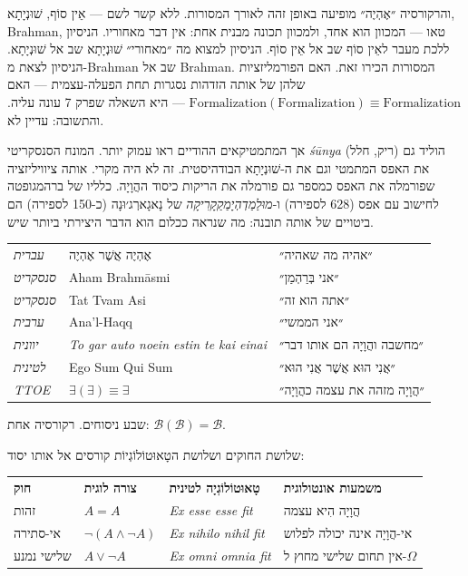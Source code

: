 \documentclass[10pt, openany, oneside]{book}
\renewcommand{\footnotesize}{\fontsize{8.5}{11}\selectfont}
\begin{document}
והרקורסיה ״אֶהְיֶה״ מופיעה באופן זהה לאורך המסורות. ללא קשר לשם — אֵין סוֹף, שׁוּנְיָתָא, Brahman, טאו — המכוון הוא אחד, ולמכוון תכונה מבנית אחת: אין דבר מאחוריו. הניסיון ללכת מעבר לאֵין סוֹף שב אל אֵין סוֹף. הניסיון למצוא מה ״מאחורי״ שׁוּנְיָתָא שב אל שׁוּנְיָתָא. הניסיון לצאת מ-Brahman שב אל Brahman. המסורות הכירו זאת. האם הפורמליזציות שלהן של אותה הזדהות נסגרות תחת הפעלה-עצמית — האם $\text{Formalization}(\text{Formalization}) \equiv \text{Formalization}$ — היא השאלה שפרק 7 עונה עליה. והתשובה: עדיין לא.

אך המתמטיקאים ההודיים ראו עמוק יותר. המונח הסנסקריטי \textit{śūnya} (ריק, חלל) הוליד גם את האפס המתמטי וגם את ה-שׁוּנְיָתָא הבודהיסטית. זה לא היה מקרי. אותה ציוויליזציה שפורמלה את האפס כמספר גם פורמלה את הריקות כיסוד ההֲוָיָה. כלליו של ברהמגופטה לחישוב עם אפס (628 לספירה) ו-\textit{מוּלַמַדְהְיָמַקַקָרִיקָה} של נָאגָארְג׳וּנָה (כ-150 לספירה) הם ביטויים של אותה תובנה: מה שנראה ככלום הוא הדבר היצירתי ביותר שיש.

\vspace{0.3em}

{\footnotesize
\noindent\begin{tabular}{l l l}
\textit{עברית} & אֶהְיֶה אֲשֶׁר אֶהְיֶה & ״אהיה מה שאהיה״ \\
\textit{סנסקריט} & Aham Brahmāsmi & ״אני בְּרַהְמַן״ \\
\textit{סנסקריט} & Tat Tvam Asi & ״אתה הוא זה״ \\
\textit{ערבית} & Ana'l-Haqq & ״אני הממשי״ \\
\textit{יוונית} & \textit{To gar auto noein estin te kai einai} & ״מחשבה והֲוָיָה הם אותו דבר״ \\
\textit{לטינית} & Ego Sum Qui Sum & ״אֲנִי הוּא אֲשֶׁר אֲנִי הוּא״ \\
\textit{TTOE} & $\exists(\exists) \equiv \exists$ & ״הֲוָיָה מזהה את עצמה כהֲוָיָה״ \\
\end{tabular}
}

\vspace{0.8em}

\noindent שבע ניסוחים. רקורסיה אחת: $\mathcal{B}(\mathcal{B}) = \mathcal{B}$.

\vspace{0.8em}

\noindent שלושת החוקים ושלושת הטָאוּטוֹלוֹגְיוֹת קורסים אל אותו יסוד:

\vspace{0.5em}

{\footnotesize
\noindent\begin{tabular}{l l l p{}}
\textbf{חוק} & \textbf{צורה לוגית} & \textbf{טָאוּטוֹלוֹגְיָה לטינית} & \textbf{משמעות אונטולוגית} \\[0.4em]
זהות & $A = A$ & \textit{Ex esse esse fit} & הֲוָיָה הִיא עצמה \\[0.2em]
אי-סתירה & $\neg(A \wedge \neg A)$ & \textit{Ex nihilo nihil fit} & אי-הֲוָיָה אינה יכולה לפלוש \\[0.2em]
שלישי נמנע & $A \vee \neg A$ & \textit{Ex omni omnia fit} & אין תחום שלישי מחוץ ל-$\Omega$ \\[0.2em]
\end{tabular}
}
\end{document}
